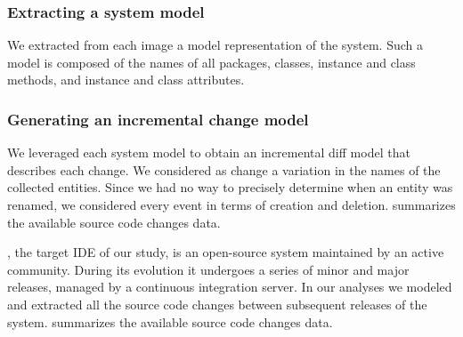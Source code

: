 \subsubsection{Extracting a system model}

We extracted from each image a model representation of the system.
Such a model is composed of the names of all packages, classes, instance and class methods, and instance and class attributes.


\subsubsection{Generating an incremental change model}

We leveraged each system model to obtain an incremental diff model that describes each change.
We considered as change a variation in the names of the collected entities.
Since we had no way to precisely determine when an entity was renamed, we considered every event in terms of creation and deletion.
 summarizes the available source code changes data.

\pha, the target IDE of our study, is an open-source system maintained by an active community.
During its evolution it undergoes a series of minor and major releases, managed by a continuous integration server.
In our analyses we modeled and extracted all the source code changes between subsequent releases of the system.
 summarizes the available source code changes data.

